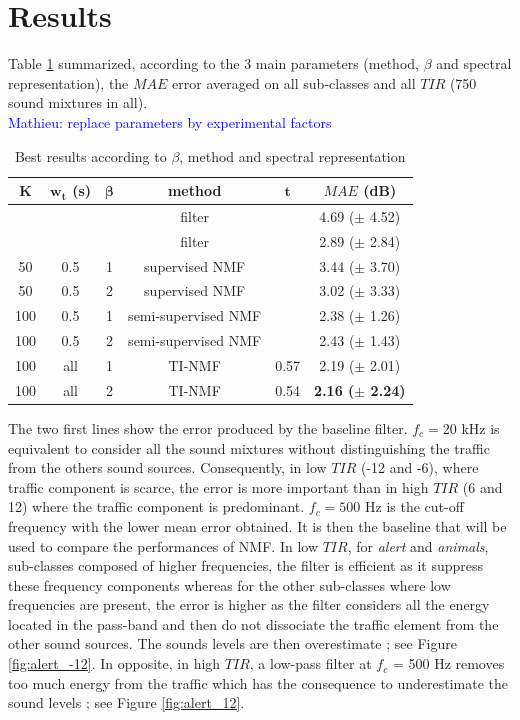 \documentclass[twocolumn,a4paper,10pt]{article}
\newcommand{\ml}[1]{\textcolor{blue}{ Mathieu: #1}}
\begin{document}
\section{Results}\label{part:results}

Table \ref{tab:results} summarized, according to the 3 main parameters (method, $\beta$ and spectral representation), the $MAE$ error averaged on all sub-classes and all $TIR$ (750 sound mixtures in all).\\

\ml{replace parameters by experimental factors}

\begin{table}[]
\centering
\begin{tabular}{@{}cccccc@{}}
\toprule
$\mathbf{K}$ & $\mathbf{w_t}$ (s) &  $\mathbf{\beta}$ & \textbf{method} & $\mathbf{t}$ & \textbf{$MAE$ (dB)} \\ \midrule
 &  &  & filter &  & 4.69 ($\pm$ 4.52) \\
 &  &  & filter &  & 2.89 ($\pm$ 2.84) \\ \hline \hline
50 & 0.5  & 1 & supervised NMF &  & 3.44 ($\pm$ 3.70) \\
50 & 0.5  & 2 & supervised NMF &  & 3.02 ($\pm$ 3.33) \\ \hline \hline
100 & 0.5 & 1 & semi-supervised NMF &  & 2.38 ($\pm$ 1.26) \\
100 & 0.5 & 2 & semi-supervised NMF &  & 2.43 ($\pm$ 1.43) \\ \hline \hline
100 & all & 1 & TI-NMF & 0.57 & 2.19 ($\pm$ 2.01) \\
100 & all & 2 & TI-NMF & 0.54 & \textbf{2.16 ($\pm$ 2.24)}\\ \bottomrule
\end{tabular}
\caption{Best results according to $\beta$, method and  spectral representation}
\label{tab:results}
\end{table}


The two first lines show the error produced by the baseline filter. $f_c = 20 $ kHz is equivalent to consider all the sound mixtures without distinguishing the traffic from the others sound sources. Consequently, in low $TIR$ (-12 and -6), where traffic component is scarce, the error is more important than in high $TIR$ (6 and 12) where the traffic component is predominant. $f_c = 500$ Hz is the cut-off frequency with the lower mean error obtained. It is then the baseline that will be used to compare the performances of NMF. In low $TIR$, for \textit{alert} and \textit{animals}, sub-classes composed of higher frequencies, the filter is efficient as it suppress these frequency components whereas for the other sub-classes where low frequencies are present, the error is higher as the filter considers all the energy located in the pass-band and then do not dissociate the traffic element from the other sound sources. The sounds levels are then overestimate ; see Figure \ref{fig:alert_-12}. In opposite, in high $TIR$, a low-pass filter at $f_c$ = 500 Hz removes too much energy from the traffic which has the consequence to underestimate the sound levels ; see Figure \ref{fig:alert_12}.\\
\end{document}
